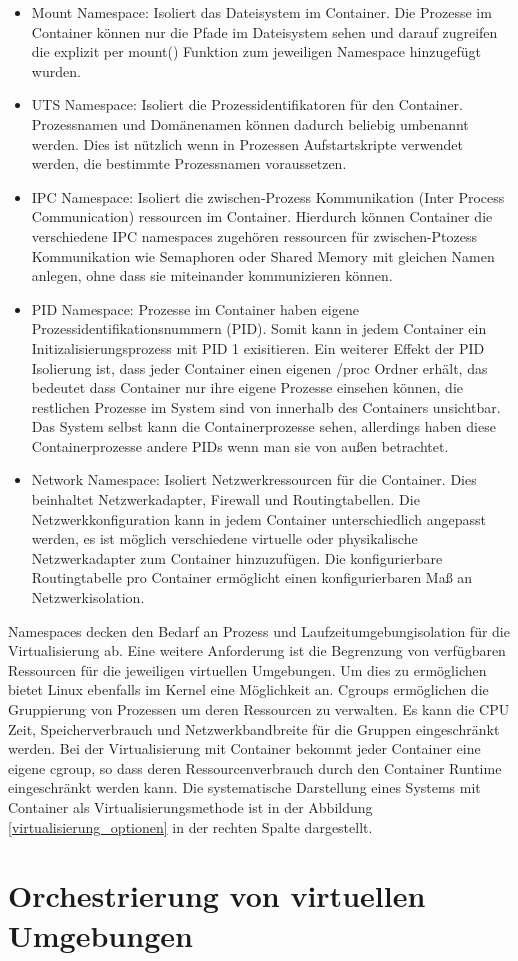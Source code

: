 \begin{itemize}
	\item Mount Namespace: Isoliert das Dateisystem im Container. Die Prozesse im Container können nur die Pfade im Dateisystem sehen und darauf zugreifen die explizit per mount() Funktion zum jeweiligen Namespace hinzugefügt wurden.
	\item UTS Namespace: Isoliert die Prozessidentifikatoren für den Container. Prozessnamen und Domänenamen können dadurch beliebig umbenannt werden. Dies ist nützlich wenn in Prozessen Aufstartskripte verwendet werden, die bestimmte Prozessnamen voraussetzen.
	\item IPC Namespace: Isoliert die zwischen-Prozess Kommunikation (Inter Process Communication) ressourcen im Container. Hierdurch können Container die verschiedene IPC namespaces zugehören ressourcen für zwischen-Ptozess Kommunikation wie Semaphoren oder Shared Memory mit gleichen Namen anlegen, ohne dass sie miteinander kommunizieren können.
	\item PID Namespace: Prozesse im Container haben eigene Prozessidentifikationsnummern (PID). Somit kann in jedem Container ein Initizalisierungsprozess mit PID 1 exisitieren. Ein weiterer Effekt der PID Isolierung ist, dass jeder Container einen eigenen /proc Ordner erhält, das bedeutet dass Container nur ihre eigene Prozesse einsehen können, die restlichen Prozesse im System sind von innerhalb des Containers unsichtbar. Das System selbst kann die Containerprozesse sehen, allerdings haben diese Containerprozesse andere PIDs wenn man sie von außen betrachtet.
	\item Network Namespace: Isoliert Netzwerkressourcen für die Container. Dies beinhaltet Netzwerkadapter, Firewall und Routingtabellen. Die Netzwerkkonfiguration kann in jedem Container unterschiedlich angepasst werden, es ist möglich verschiedene virtuelle oder physikalische Netzwerkadapter zum Container hinzuzufügen. Die konfigurierbare Routingtabelle pro Container ermöglicht einen konfigurierbaren Maß an Netzwerkisolation.
\end{itemize} 

Namespaces decken den Bedarf an Prozess und Laufzeitumgebungisolation für die Virtualisierung ab. Eine weitere Anforderung ist die Begrenzung von verfügbaren Ressourcen für die jeweiligen virtuellen Umgebungen. Um dies zu ermöglichen bietet Linux ebenfalls im Kernel eine Möglichkeit an. Cgroups ermöglichen die Gruppierung von Prozessen um deren Ressourcen zu verwalten. Es kann die CPU Zeit, Speicherverbrauch und Netzwerkbandbreite für die Gruppen eingeschränkt werden. Bei der Virtualisierung mit Container bekommt jeder Container eine eigene cgroup, so dass deren Ressourcenverbrauch durch den Container Runtime eingeschränkt werden kann. \cite{Red2024} 
Die systematische Darstellung eines Systems mit Container als Virtualisierungsmethode ist in der Abbildung \ref{virtualisierung_optionen} in der rechten Spalte dargestellt. 

\section{Orchestrierung von virtuellen Umgebungen}

